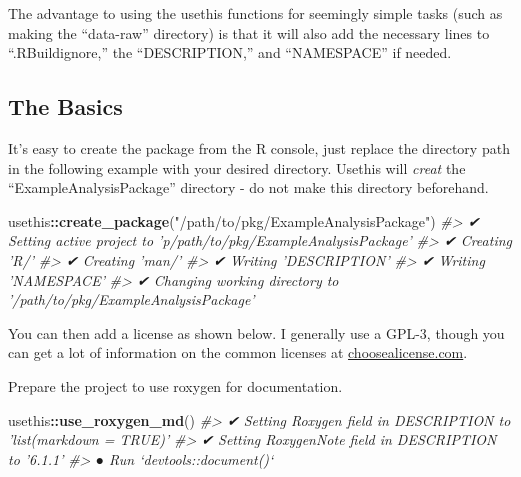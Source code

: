 \documentclass[]{book}
\newenvironment{Shaded}{\begin{snugshade}}{\end{snugshade}}
\newcommand{\CommentTok}[1]{\textcolor[rgb]{0.56,0.35,0.01}{\textit{#1}}}
\newcommand{\DataTypeTok}[1]{\textcolor[rgb]{0.13,0.29,0.53}{#1}}
\newcommand{\KeywordTok}[1]{\textcolor[rgb]{0.13,0.29,0.53}{\textbf{#1}}}
\newcommand{\NormalTok}[1]{#1}
\newcommand{\OperatorTok}[1]{\textcolor[rgb]{0.81,0.36,0.00}{\textbf{#1}}}
\newcommand{\StringTok}[1]{\textcolor[rgb]{0.31,0.60,0.02}{#1}}
\begin{document}
The advantage to using the usethis functions for seemingly simple tasks (such as making the ``data-raw'' directory) is that it will also add the necessary lines to ``.RBuildignore,'' the ``DESCRIPTION,'' and ``NAMESPACE'' if needed.

\hypertarget{the-basics}{%
\subsection{The Basics}\label{the-basics}}

It's easy to create the package from the R console, just replace the directory path in the following example with your desired directory. Usethis will \emph{creat} the ``ExampleAnalysisPackage'' directory - do not make this directory beforehand.

\begin{Shaded}
\begin{Highlighting}[]
\NormalTok{usethis}\OperatorTok{::}\KeywordTok{create_package}\NormalTok{(}\StringTok{"/path/to/pkg/ExampleAnalysisPackage"}\NormalTok{)}
\CommentTok{#> ✔ Setting active project to 'p/path/to/pkg/ExampleAnalysisPackage'}
\CommentTok{#> ✔ Creating 'R/'}
\CommentTok{#> ✔ Creating 'man/'}
\CommentTok{#> ✔ Writing 'DESCRIPTION'}
\CommentTok{#> ✔ Writing 'NAMESPACE'}
\CommentTok{#> ✔ Changing working directory to '/path/to/pkg/ExampleAnalysisPackage'}
\end{Highlighting}
\end{Shaded}

You can then add a license as shown below. I generally use a GPL-3, though you can get a lot of information on the common licenses at \href{https://choosealicense.com}{choosealicense.com}.

\begin{Shaded}
\end{Shaded}

Prepare the project to use roxygen for documentation.

\begin{Shaded}
\begin{Highlighting}[]
\NormalTok{usethis}\OperatorTok{::}\KeywordTok{use_roxygen_md}\NormalTok{()}
\CommentTok{#> ✔ Setting Roxygen field in DESCRIPTION to 'list(markdown = TRUE)'}
\CommentTok{#> ✔ Setting RoxygenNote field in DESCRIPTION to '6.1.1'}
\CommentTok{#> ● Run `devtools::document()`}
\end{Highlighting}
\end{Shaded}
\end{document}
